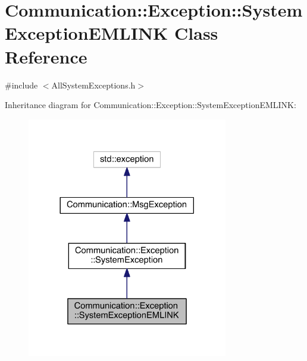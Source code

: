 \hypertarget{class_communication_1_1_exception_1_1_system_exception_e_m_l_i_n_k}{}\section{Communication\+:\+:Exception\+:\+:System\+Exception\+E\+M\+L\+I\+N\+K Class Reference}
\label{class_communication_1_1_exception_1_1_system_exception_e_m_l_i_n_k}


{\ttfamily \#include $<$All\+System\+Exceptions.\+h$>$}



Inheritance diagram for Communication\+:\+:Exception\+:\+:System\+Exception\+E\+M\+L\+I\+N\+K\+:\nopagebreak
\begin{figure}[H]
\begin{center}
\leavevmode
\includegraphics[width=248pt]{class_communication_1_1_exception_1_1_system_exception_e_m_l_i_n_k__inherit__graph}
\end{center}
\end{figure}


